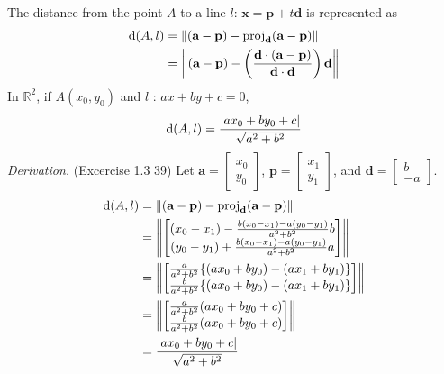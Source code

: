 \noindent
The distance from the point $A$ to a line $l$: $\textbf{x}=\textbf{p}+t\textbf{d}$ is represented as
\begin{align*}
	\textnormal{d}(A,l)
	&=\left\| (\textbf{a}-\textbf{p})-\textnormal{proj}_\textbf{d}(\textbf{a}-\textbf{p})\right\| \\
	&= \left\| (\textbf{a}-\textbf{p}) - \left(\frac{\textbf{d}\cdot(\textbf{a}-\textbf{p})}{\textbf{d}\cdot\textbf{d}}\right)\textbf{d} \right\|
\end{align*}
In $\mathbb{R}^2$, if $A(x_0,y_0)$ and $l$ : $ax + by + c = 0$,
\begin{align*}
	\textnormal{d}(A, l) = \frac{|ax_0+by_0+c|}{\sqrt{a^2+b^2}}
\end{align*}
\textit{Derivation.} (Excercise 1.3 39)
Let $\textbf{a}=\begin{bmatrix} x_0 \\ y_0 \end{bmatrix}$,
$\textbf{p}=\begin{bmatrix} x_1 \\ y_1 \end{bmatrix}$,
and $\textbf{d}=\begin{bmatrix} b \\ -a \end{bmatrix}$.
\begin{align*}
	\textnormal{d}(A,l)
	&= \left\|(\textbf{a}-\textbf{p})-\textnormal{proj}_\textbf{d}(\textbf{a}-\textbf{p})\right\| \\
	&= \left\|\begin{bmatrix}
		(x_0-x_1)-\frac{b(x_0-x_1)-a(y_0-y_1)}{a^2+b^2}b \\
		(y_0-y_1)+\frac{b(x_0-x_1)-a(y_0-y_1)}{a^2+b^2}a
	\end{bmatrix}\right\| \\
	&= \left\|\begin{bmatrix}
		\frac{a}{a^2+b^2}\{(ax_0+by_0) - (ax_1+by_1)\} \\
		\frac{b}{a^2+b^2}\{(ax_0+by_0) - (ax_1+by_1)\}
	\end{bmatrix}\right\| \\
	&= \left\|\begin{bmatrix}
	\frac{a}{a^2+b^2}(ax_0+by_0+c) \\
	\frac{b}{a^2+b^2}(ax_0+by_0+c)
	\end{bmatrix}\right\| \\
	&= \frac{|ax_0+by_0+c|}{\sqrt{a^2+b^2}}
\end{align*}

